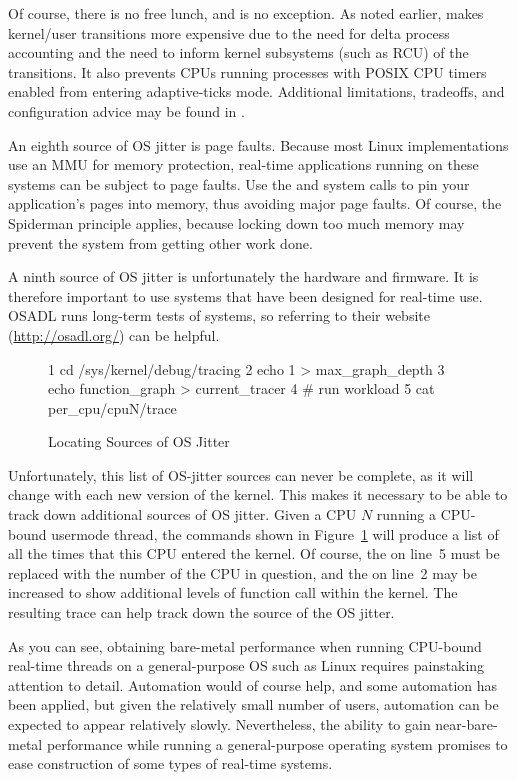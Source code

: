 Of course, there is no free lunch, and  is no exception.
As noted earlier,
 makes kernel/user transitions more expensive due to the
need for delta process accounting and the need to inform kernel subsystems
(such as RCU) of the transitions.
It also prevents CPUs running processes with POSIX CPU timers enabled
from entering adaptive-ticks mode.
Additional limitations, tradeoffs, and configuration advice may be
found in .

An eighth source of OS jitter is page faults.
Because most Linux implementations use an MMU for memory protection,
real-time applications running on these systems can be subject
to page faults.
Use the  and  system calls to pin your
application's pages into memory, thus avoiding major page faults.
Of course, the Spiderman principle applies, because locking down
too much memory may prevent the system from getting other work done.

A ninth source of OS jitter is unfortunately the hardware and firmware.
It is therefore important to use systems that have been designed for
real-time use.
OSADL runs long-term tests of systems, so referring to their
website (\url{http://osadl.org/}) can be helpful.

\begin{figure}[tb]
{ \scriptsize
\begin{verbbox}
 1 cd /sys/kernel/debug/tracing
 2 echo 1 > max_graph_depth
 3 echo function_graph > current_tracer
 4 # run workload
 5 cat per_cpu/cpuN/trace
\end{verbbox}
}
\centering
\theverbbox
\caption{Locating Sources of OS Jitter}
\label{fig:rt:Locating Sources of OS Jitter}
\end{figure}

Unfortunately, this list of OS-jitter sources can never be complete,
as it will change with each new version of the kernel.
This makes it necessary to be able to track down additional sources
of OS jitter.
Given a CPU $N$ running a CPU-bound usermode thread, the
commands shown in
Figure~\ref{fig:rt:Locating Sources of OS Jitter}
will produce a list of all the times that this CPU entered the kernel.
Of course, the  on line~5 must be replaced with the
number of the CPU in question, and the  on line~2 may be increased
to show additional levels of function call within the kernel.
The resulting trace can help track down the source of the OS jitter.

As you can see, obtaining bare-metal performance when running
CPU-bound real-time threads on a general-purpose OS such as Linux
requires painstaking attention to detail.
Automation would of course help, and some automation has been applied,
but given the relatively small number of users, automation can be
expected to appear relatively slowly.
Nevertheless, the ability to gain near-bare-metal performance while
running a general-purpose operating system promises to ease construction
of some types of real-time systems.

